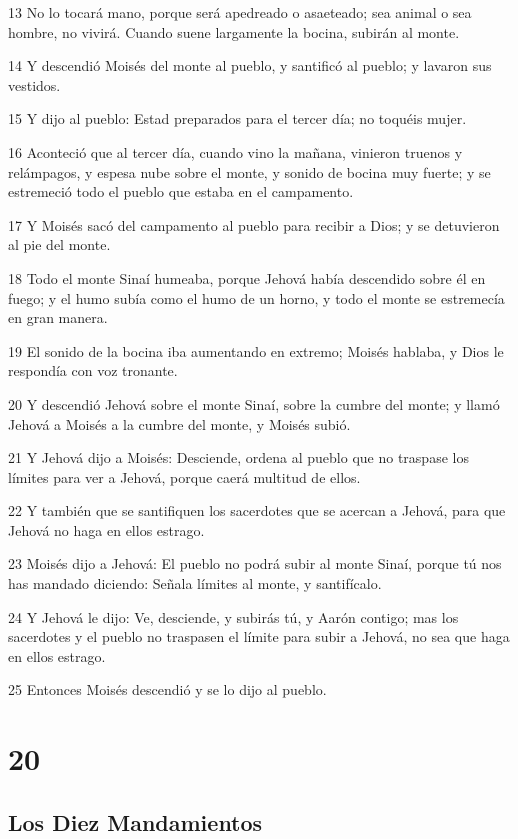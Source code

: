 \par 13 No lo tocará mano, porque será apedreado o asaeteado; sea animal o sea hombre, no vivirá. Cuando suene largamente la bocina, subirán al monte.
\par 14 Y descendió Moisés del monte al pueblo, y santificó al pueblo; y lavaron sus vestidos.
\par 15 Y dijo al pueblo: Estad preparados para el tercer día; no toquéis mujer.
\par 16 Aconteció que al tercer día, cuando vino la mañana, vinieron truenos y relámpagos, y espesa nube sobre el monte, y sonido de bocina muy fuerte; y se estremeció todo el pueblo que estaba en el campamento.
\par 17 Y Moisés sacó del campamento al pueblo para recibir a Dios; y se detuvieron al pie del monte.
\par 18 Todo el monte Sinaí humeaba, porque Jehová había descendido sobre él en fuego; y el humo subía como el humo de un horno, y todo el monte se estremecía en gran manera.
\par 19 El sonido de la bocina iba aumentando en extremo; Moisés hablaba, y Dios le respondía con voz tronante.
\par 20 Y descendió Jehová sobre el monte Sinaí, sobre la cumbre del monte; y llamó Jehová a Moisés a la cumbre del monte, y Moisés subió.
\par 21 Y Jehová dijo a Moisés: Desciende, ordena al pueblo que no traspase los límites para ver a Jehová, porque caerá multitud de ellos.
\par 22 Y también que se santifiquen los sacerdotes que se acercan a Jehová, para que Jehová no haga en ellos estrago.
\par 23 Moisés dijo a Jehová: El pueblo no podrá subir al monte Sinaí, porque tú nos has mandado diciendo: Señala límites al monte, y santifícalo.
\par 24 Y Jehová le dijo: Ve, desciende, y subirás tú, y Aarón contigo; mas los sacerdotes y el pueblo no traspasen el límite para subir a Jehová, no sea que haga en ellos estrago.
\par 25 Entonces Moisés descendió y se lo dijo al pueblo.

\chapter{20}

\section*{Los Diez Mandamientos}

